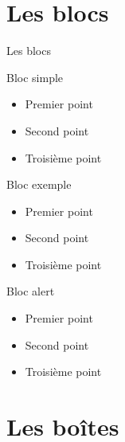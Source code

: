 \documentclass{bredelebeamer}
\begin{document}
\section{Les blocs}

\begin{frame}{Les blocs}

\begin{block}{Bloc simple}
\begin{itemize}
\item Premier point
\item Second point
\item Troisième point
\end{itemize}
\end{block}

\begin{exampleblock}{Bloc exemple}
\begin{itemize}
\item Premier point
\item Second point
\item Troisième point
\end{itemize}
\end{exampleblock}

\begin{alertblock}{Bloc alert}
\begin{itemize}
\item Premier point
\item Second point
\item Troisième point
\end{itemize}
\end{alertblock}
\end{frame}


\section{Les bo\^ites}
\end{document}
